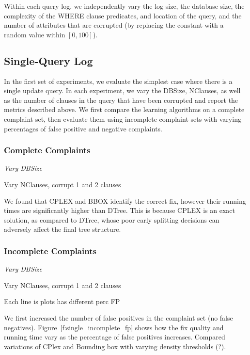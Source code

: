 Within each query log, we independently vary the log size, the
database size, the complexity of the WHERE clause predicates, and
location of the query, and the number of attributes that are corrupted
(by replacing the constant with a random value within $[0, 100]$).





\subsection{Single-Query Log}

In the first set of experiments, we evaluate the simplest case where there
is a single update query.  In each experiment, we vary the DBSize,
NClauses, as well as the number of clauses in the query that have
been corrupted and report the metrics described above.  We first 
compare the learning algorithms on a complete complaint set, then evaluate them
using incomplete complaint sets with varying percentages of false positive and negative complaints.

\subsubsection{Complete Complaints}

{\it Vary DBSize

Vary NClauses, corrupt 1 and 2 clauses
}

We found that CPLEX and BBOX identify the correct fix, however their
running times are significantly higher than DTree.  This is because
CPLEX is an exact solution, as compared to DTree, whose poor early
splitting decisions can adversely affect the final tree structure.

\subsubsection{Incomplete Complaints}


{\it 
Vary DBSize

Vary NClauses, corrupt 1 and 2 clauses

Each line is plots has different perc FP
}

We first increased the number of false positives in the complaint set (no false negatives).
Figure~\ref{f:single_incomplete_fp} shows how the fix quality and running time vary as the
percentage of false positives increases.   Compared variations of CPlex and Bounding box with varying
density thresholds (?).

